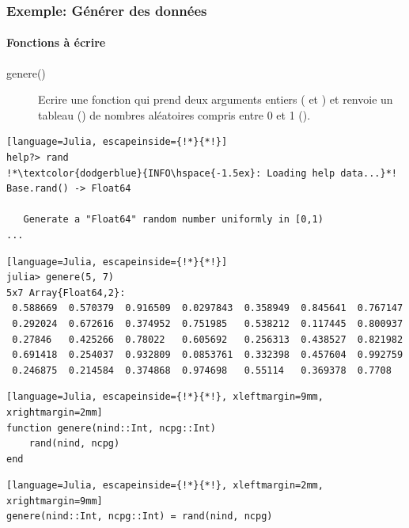 \begin{frame}[fragile]
    \frametitle{\textcolor{goldenrod2}{Exemple:} Générer des données}
    \framesubtitle{Fonctions à écrire}
    \begin{description}
                \item[genere()] Ecrire une fonction  qui prend deux arguments entiers ( et ) et renvoie un tableau () de nombres aléatoires compris entre 0 et 1 ().
    \end{description}
    \pause
\begin{lstlisting}[language=Julia, escapeinside={!*}{*!}]
help?> rand
!*\textcolor{dodgerblue}{INFO\hspace{-1.5ex}: Loading help data...}*!
Base.rand() -> Float64

   Generate a "Float64" random number uniformly in [0,1)
...
\end{lstlisting}
    \vspace{-2ex}
    \pause
\begin{lstlisting}[language=Julia, escapeinside={!*}{*!}]
julia> genere(5, 7)
5x7 Array{Float64,2}:
 0.588669  0.570379  0.916509  0.0297843  0.358949  0.845641  0.767147
 0.292024  0.672616  0.374952  0.751985   0.538212  0.117445  0.800937
 0.27846   0.425266  0.78022   0.605692   0.256313  0.438527  0.821982
 0.691418  0.254037  0.932809  0.0853761  0.332398  0.457604  0.992759
 0.246875  0.214584  0.374868  0.974698   0.55114   0.369378  0.7708
\end{lstlisting}
    \vspace{-2ex}
    \pause
    \vspace{-2ex}
\begin{multicols}{2}
\begin{lstlisting}[language=Julia, escapeinside={!*}{*!}, xleftmargin=9mm, xrightmargin=2mm]
function genere(nind::Int, ncpg::Int)
    rand(nind, ncpg)
end
\end{lstlisting}
\columnbreak
\begin{lstlisting}[language=Julia, escapeinside={!*}{*!}, xleftmargin=2mm, xrightmargin=9mm]
genere(nind::Int, ncpg::Int) = rand(nind, ncpg)
\end{lstlisting}
\end{multicols}
\end{frame}


